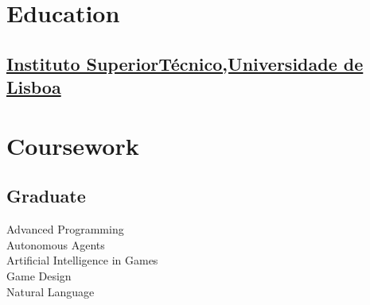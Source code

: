 \documentclass[a4paper]{deedy-resume} %
\begin{document}
\begin{minipage}[t]{0.33\textwidth} %


\section{Education} 


\subsection{\href{https://tecnico.ulisboa.pt/}{Instituto Superior\newline Técnico,\vspace{2pt}\break Universidade de Lisboa}}


\sectionspace %


\sectionspace %



\section{Coursework}

\subsection{Graduate}

Advanced Programming \\
Autonomous Agents \\
Artificial Intelligence in Games \\
Game Design\\
Natural Language \\

\sectionspace %



\end{minipage}
\end{document}
